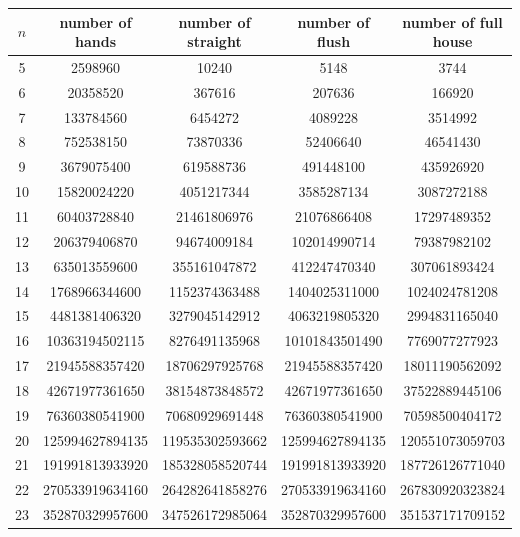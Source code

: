 \documentclass{article}
\begin{document}
\begin{table}[htbp]
\begin{center}
    \begin{tabular}{|c||c|c|c|c|}
    \hline
        $n$ & number of hands & number of straight & number of flush & number of full house\\ \hline\hline 
        5 & 2598960 & 10240 & 5148 & 3744 \\ \hline
        6 & 20358520 & 367616 & 207636 & 166920 \\ \hline
        7 & 133784560 & 6454272 & 4089228 & 3514992 \\ \hline
        8 & 752538150 & 73870336 & 52406640 & 46541430 \\ \hline
        9 & 3679075400 & 619588736 & 491448100 & 435926920 \\ \hline
        10 & 15820024220 & 4051217344 & 3585287134 & 3087272188 \\ \hline
        11 & 60403728840 & 21461806976 & 21076866408 & 17297489352 \\ \hline
        12 & 206379406870 & 94674009184 & 102014990714 & 79387982102 \\ \hline
        13 & 635013559600 & 355161047872 & 412247470340 & 307061893424 \\ \hline
        14 & 1768966344600 & 1152374363488 & 1404025311000 & 1024024781208 \\ \hline
        15 & 4481381406320 & 3279045142912 & 4063219805320 & 2994831165040 \\ \hline
        16 & 10363194502115 & 8276491135968 & 10101843501490 & 7769077277923 \\ \hline
        17 & 21945588357420 & 18706297925768 & 21945588357420 & 18011190562092 \\ \hline
        18 & 42671977361650 & 38154873848572 & 42671977361650 & 37522889445106 \\ \hline
        19 & 76360380541900 & 70680929691448 & 76360380541900 & 70598500404172 \\ \hline
        20 & 125994627894135 & 119535302593662 & 125994627894135 & 120551073059703 \\ \hline
        21 & 191991813933920 & 185328058520744 & 191991813933920 & 187726126771040 \\ \hline
        22 & 270533919634160 & 264282641858276 & 270533919634160 & 267830920323824 \\ \hline
        23 & 352870329957600 & 347526172985064 & 352870329957600 & 351537171709152 \\ \hline

\end{tabular}
\end{center}
\end{table}
\end{document}

